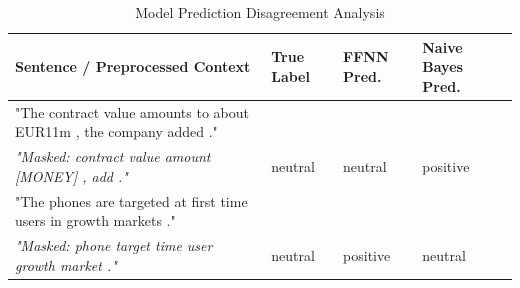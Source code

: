 \begin{table}[h]
\centering
\caption{Model Prediction Disagreement Analysis}\n\begin{tabular}{|p{8cm}|p{2cm}|p{2cm}|p{2cm}|}
\hline
\textbf{Sentence / Preprocessed Context} & \textbf{True Label} & \textbf{FFNN Pred.} & \textbf{Naive Bayes Pred.}  \\ \hline
"The contract value amounts to about EUR11m , the company added ." \\ \textit{"Masked: contract value amount [MONEY] , add ."} & neutral & neutral & positive  \\ \hline
"The phones are targeted at first time users in growth markets ." \\ \textit{"Masked: phone target time user growth market ."} & neutral & positive & neutral  \\ \hline
\end{tabular}
\end{table}